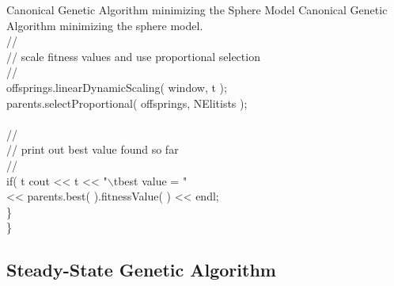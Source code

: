 \begin{programlisting}{Canonical Genetic Algorithm minimizing the Sphere Model}{
    Canonical Genetic Algorithm minimizing the sphere model.}
\\
        //\\
        // scale fitness values and use proportional selection\\
        //\\
        offsprings.linearDynamicScaling( window, t );\\
        parents.selectProportional( offsprings, NElitists );\\
\\
        //\\
        // print out best value found so far\\
        //\\
        if( t %
            cout << t << "$\backslash$tbest value = "\\
                 << parents.best( ).fitnessValue( ) << endl;\\
    \}\\
\}\\
\end{programlisting}

\clearpage
\subsection{Steady-State Genetic Algorithm}


